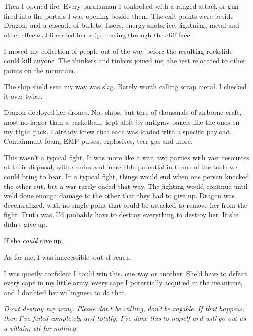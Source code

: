 Then I opened fire.  Every parahuman I controlled with a ranged attack or gun fired into the portals I was opening beside them.  The exit-points were beside Dragon, and a cascade of bullets, lasers, energy shots, ice, lightning, metal and other effects obliterated her ship, tearing through the cliff face.



I moved my collection of people out of the way before the resulting rockslide could kill anyone.  The thinkers and tinkers joined me, the rest relocated to other points on the mountain.



The ship she'd sent my way was slag.  Barely worth calling scrap metal.  I checked it over twice.



Dragon deployed her drones.  Not ships, but tens of thousands of airborne craft, most no larger than a basketball, kept aloft by antigrav panels like the ones on my flight pack.  I already knew that each was loaded with a specific payload.  Containment foam, EMP pulses, explosives, tear gas and more.



This wasn't a typical fight.  It was more like a war, two parties with vast resources at their disposal, with armies and incredible potential in terms of the tools we could bring to bear.  In a typical fight, things would end when one person knocked the other out, but a war rarely ended that way.  The fighting would continue until we'd done enough damage to the other that they had to give up.  Dragon was decentralized, with no single point that could be attacked to remove her from the fight.  Truth was, I'd probably have to destroy everything to destroy her.  If she didn't give up.



If she \emph{could} give up.



As for me, I was inaccessible, out of reach.



I was quietly confident I could win this, one way or another.  She'd have to defeat every cape in my little army, every cape I potentially acquired in the meantime, and I doubted her willingness to do that.



\emph{Don't destroy my army.  Please don't be willing, don't be capable.  If that happens, then I've failed completely and totally, I've done this to myself and will go out as a villain, all for nothing.}



